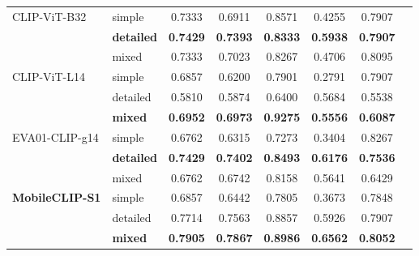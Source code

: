\documentclass[hidelinks, 11pt]{article}
\begin{document}
\begin{longtable}{@{}llcccccc@{}}
CLIP-ViT-B32            & simple            & 0.7333          & 0.6911          & 0.8571          & 0.4255          & 0.7907          \\
\textbf{}               & \textbf{detailed} & \textbf{0.7429} & \textbf{0.7393} & \textbf{0.8333} & \textbf{0.5938} & \textbf{0.7907} \\
                        & mixed             & 0.7333          & 0.7023          & 0.8267          & 0.4706          & 0.8095          \\
\addlinespace
CLIP-ViT-L14            & simple            & 0.6857          & 0.6200          & 0.7901          & 0.2791          & 0.7907          \\
                        & detailed          & 0.5810          & 0.5874          & 0.6400          & 0.5684          & 0.5538          \\
\textbf{}               & \textbf{mixed}    & \textbf{0.6952} & \textbf{0.6973} & \textbf{0.9275} & \textbf{0.5556} & \textbf{0.6087} \\
\addlinespace
EVA01-CLIP-g14          & simple            & 0.6762          & 0.6315          & 0.7273          & 0.3404          & 0.8267          \\
\textbf{}               & \textbf{detailed} & \textbf{0.7429} & \textbf{0.7402} & \textbf{0.8493} & \textbf{0.6176} & \textbf{0.7536} \\
                        & mixed             & 0.6762          & 0.6742          & 0.8158          & 0.5641          & 0.6429          \\
\addlinespace
\textbf{MobileCLIP-S1}  & simple            & 0.6857          & 0.6442          & 0.7805          & 0.3673          & 0.7848          \\
                        & detailed          & 0.7714          & 0.7563          & 0.8857          & 0.5926          & 0.7907          \\
\textbf{}               & \textbf{mixed}    & \textbf{0.7905} & \textbf{0.7867} & \textbf{0.8986} & \textbf{0.6562} & \textbf{0.8052} \\

\end{longtable}
\end{document}
